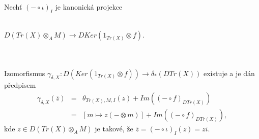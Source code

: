         \begin{thm}\label{izo-gamma-existuje}
           Nechť $(-\circ \iota )_I$ je kanonická projekce \\\\
           \centerline{$D(Tr(X)\otimes_A M)\rightarrow DKer(1_{Tr(X)}\otimes  f)$.} \\\\
           Izomorfismus $\gamma_{\delta, X}:D(Ker(1_{Tr(X)}\otimes f)) \rightarrow \delta_*(DTr(X))$ 
           existuje a je dán předpisem 
           \begin{eqnarray}
             \gamma_{\delta, X}(\bar{z}) &=& \theta_{Tr(X),M,I}(z)+Im((-\circ f)_{DTr(X)}) \nonumber \\
             &=& [m\mapsto z(-\otimes m)]+Im((-\circ f)_{DTr(X)}), \nonumber
           \end{eqnarray}
           kde $z\in D(Tr(X)\otimes_A M)$ je takové, že $\bar{z}=(-\circ \iota)_I(z)=zi$.
        \end{thm}
